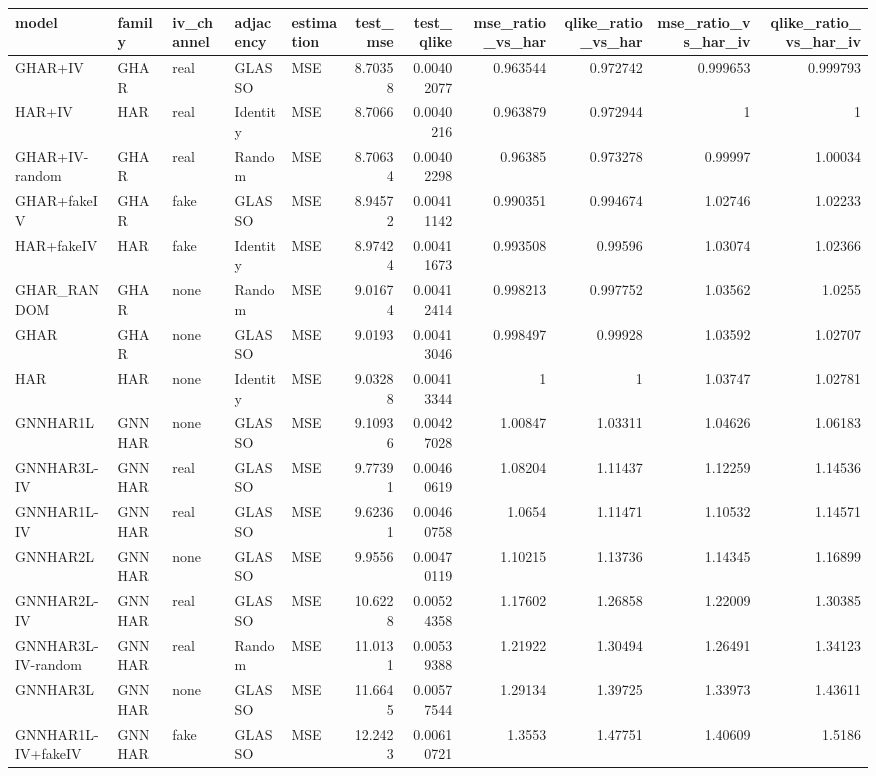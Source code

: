 \begin{tabular}{lllllrrrrrr}
\toprule
model & family & iv_channel & adjacency & estimation & test_mse & test_qlike & mse_ratio_vs_har & qlike_ratio_vs_har & mse_ratio_vs_har_iv & qlike_ratio_vs_har_iv \\
\midrule
GHAR+IV & GHAR & real & GLASSO & MSE & 8.70358 & 0.00402077 & 0.963544 & 0.972742 & 0.999653 & 0.999793 \\
HAR+IV & HAR & real & Identity & MSE & 8.7066 & 0.0040216 & 0.963879 & 0.972944 & 1 & 1 \\
GHAR+IV-random & GHAR & real & Random & MSE & 8.70634 & 0.00402298 & 0.96385 & 0.973278 & 0.99997 & 1.00034 \\
GHAR+fakeIV & GHAR & fake & GLASSO & MSE & 8.94572 & 0.00411142 & 0.990351 & 0.994674 & 1.02746 & 1.02233 \\
HAR+fakeIV & HAR & fake & Identity & MSE & 8.97424 & 0.00411673 & 0.993508 & 0.99596 & 1.03074 & 1.02366 \\
GHAR_RANDOM & GHAR & none & Random & MSE & 9.01674 & 0.00412414 & 0.998213 & 0.997752 & 1.03562 & 1.0255 \\
GHAR & GHAR & none & GLASSO & MSE & 9.0193 & 0.00413046 & 0.998497 & 0.99928 & 1.03592 & 1.02707 \\
HAR & HAR & none & Identity & MSE & 9.03288 & 0.00413344 & 1 & 1 & 1.03747 & 1.02781 \\
GNNHAR1L & GNNHAR & none & GLASSO & MSE & 9.10936 & 0.00427028 & 1.00847 & 1.03311 & 1.04626 & 1.06183 \\
GNNHAR3L-IV & GNNHAR & real & GLASSO & MSE & 9.77391 & 0.00460619 & 1.08204 & 1.11437 & 1.12259 & 1.14536 \\
GNNHAR1L-IV & GNNHAR & real & GLASSO & MSE & 9.62361 & 0.00460758 & 1.0654 & 1.11471 & 1.10532 & 1.14571 \\
GNNHAR2L & GNNHAR & none & GLASSO & MSE & 9.9556 & 0.00470119 & 1.10215 & 1.13736 & 1.14345 & 1.16899 \\
GNNHAR2L-IV & GNNHAR & real & GLASSO & MSE & 10.6228 & 0.00524358 & 1.17602 & 1.26858 & 1.22009 & 1.30385 \\
GNNHAR3L-IV-random & GNNHAR & real & Random & MSE & 11.0131 & 0.00539388 & 1.21922 & 1.30494 & 1.26491 & 1.34123 \\
GNNHAR3L & GNNHAR & none & GLASSO & MSE & 11.6645 & 0.00577544 & 1.29134 & 1.39725 & 1.33973 & 1.43611 \\
GNNHAR1L-IV+fakeIV & GNNHAR & fake & GLASSO & MSE & 12.2423 & 0.00610721 & 1.3553 & 1.47751 & 1.40609 & 1.5186 \\
\bottomrule
\end{tabular}
